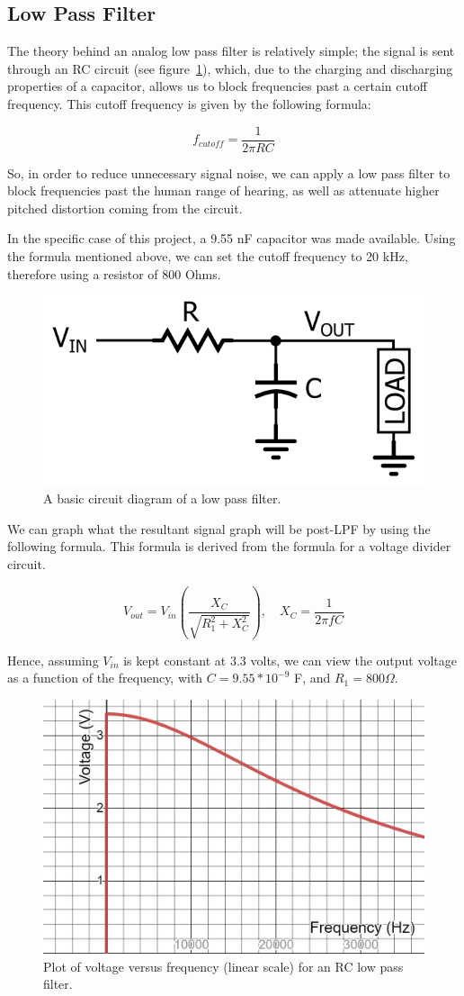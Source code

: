 \subsection{Low Pass Filter}\label{subsec:low-pass-filter}

The theory behind an analog low pass filter is relatively simple;
the signal is sent through an RC circuit (see figure~\ref{fig:LPF}), which, due to the charging and discharging properties of a capacitor, allows us to block frequencies past a certain cutoff frequency.
This cutoff frequency is given by the following formula:

\[
f_{cutoff}=\frac{1}{2 \pi R C}
\]

So, in order to reduce unnecessary signal noise, we can apply a low pass filter to block frequencies past the human range of hearing, as well as attenuate higher pitched distortion coming from the circuit. 

In the specific case of this project, a 9.55 nF capacitor was made available.
Using the formula mentioned above, we can set the cutoff frequency to 20 kHz, therefore using a resistor of 800 Ohms. 

\begin{figure}[H]
    \centering
    \includegraphics[width = 0.4 \textwidth]{lowpassfilter}
    \caption{A basic circuit diagram of a low pass filter. \cite{keim_2019}} %
    \label{fig:LPF}
\end{figure}

We can graph what the resultant signal graph will be post-LPF by using the following formula.
This formula is derived from the formula for a voltage divider circuit.



\[
V_{out}=V_{in}\left(\frac{X_{C}}{\sqrt{R_{1}^{2}+X_{C}^{2}}}\right), \quad X_{C}=\frac{1}{2 \pi f C}
\]

Hence, assuming $V_{in}$ is kept constant at 3.3 volts, we can view the output voltage as a function of the frequency, with $C = 9.55*10^{-9}$ F, and $R_1 = 800 \Omega$. 

\begin{figure}[H]
    \centering
    \includegraphics[width = 0.5 \textwidth]{lpfgraph}
    \caption{Plot of voltage versus frequency (linear scale) for an RC low pass filter. }
    \label{fig:lpfgraph}
\end{figure}

